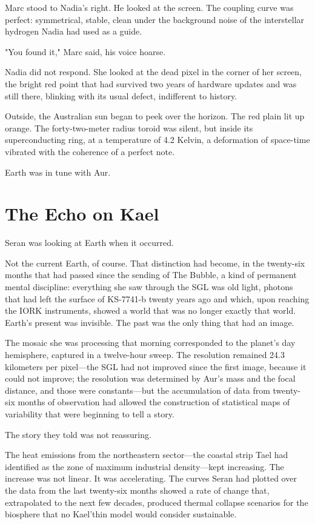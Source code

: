 \documentclass[11pt,a5paper,twoside]{book}
\begin{document}
Marc stood to Nadia's right. He looked at the screen. The coupling curve was perfect: symmetrical, stable, clean under the background noise of the interstellar hydrogen Nadia had used as a guide.

"You found it," Marc said, his voice hoarse.

Nadia did not respond. She looked at the dead pixel in the corner of her screen, the bright red point that had survived two years of hardware updates and was still there, blinking with its usual defect, indifferent to history.

Outside, the Australian sun began to peek over the horizon. The red plain lit up orange. The forty-two-meter radius toroid was silent, but inside its superconducting ring, at a temperature of 4.2 Kelvin, a deformation of space-time vibrated with the coherence of a perfect note.

Earth was in tune with Aur.

\chapter{The Echo on Kael}

Seran was looking at Earth when it occurred.

Not the current Earth, of course. That distinction had become, in the twenty-six months that had passed since the sending of The Bubble, a kind of permanent mental discipline: everything she saw through the SGL was old light, photons that had left the surface of KS-7741-b twenty years ago and which, upon reaching the IORK instruments, showed a world that was no longer exactly that world. Earth's present was invisible. The past was the only thing that had an image.

The mosaic she was processing that morning corresponded to the planet's day hemisphere, captured in a twelve-hour sweep. The resolution remained 24.3 kilometers per pixel—the SGL had not improved since the first image, because it could not improve; the resolution was determined by Aur's mass and the focal distance, and those were constants—but the accumulation of data from twenty-six months of observation had allowed the construction of statistical maps of variability that were beginning to tell a story.

The story they told was not reassuring.

The heat emissions from the northeastern sector—the coastal strip Tael had identified as the zone of maximum industrial density—kept increasing. The increase was not linear. It was accelerating. The curves Seran had plotted over the data from the last twenty-six months showed a rate of change that, extrapolated to the next few decades, produced thermal collapse scenarios for the biosphere that no Kael'thin model would consider sustainable.
\end{document}
